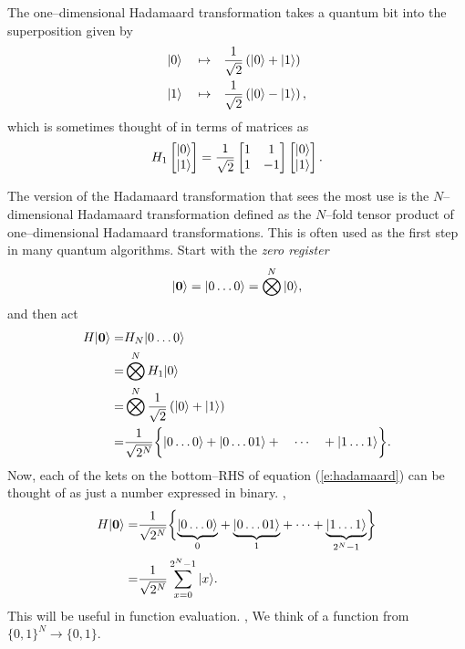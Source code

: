 The one--dimensional Hadamaard transformation takes a quantum bit into the
superposition given by
\begin{equation}
\begin{split}
{|{0}\rangle}\quad\mapsto&\quad\frac{1}{\sqrt{2}}\left({|{0}\rangle} +{|{1}\rangle}\right)\\
{|{1}\rangle}\quad\mapsto&\quad\frac{1}{\sqrt{2}}\left({|{0}\rangle} -{|{1}\rangle}\right),
\end{split}
\end{equation}
which is sometimes thought of in terms of matrices as
\begin{equation}
H_1 \left[\begin{matrix}{|{0}\rangle}\\ {|{1}\rangle}\end{matrix}\right]
= \frac{1}{\sqrt{2}}
\left[\begin{matrix}1&1\\ 1&-1\end{matrix}\right]
\left[\begin{matrix}{|{0}\rangle}\\ {|{1}\rangle}\end{matrix}\right].
\end{equation}

The version of the Hadamaard transformation that sees the most use is
the $N$--dimensional Hadamaard transformation defined as the $N$--fold
tensor product of one--dimensional Hadamaard transformations.
This is often used as the first step in many quantum algorithms.
Start with the \emph{zero register}
\begin{equation}
{|{\bf 0}\rangle}={|{0\ldots 0}\rangle} = \bigotimes^N{|{0}\rangle},
\end{equation}
and then act
\begin{equation}
\begin{split}
H{|{\bf 0}\rangle} =& H_N{|{0\ldots 0}\rangle}\\
=& \bigotimes^N H_1{|{0}\rangle}\\
=& \bigotimes^N \frac{1}{\sqrt{2}}\left({|{0}\rangle} +{|{1}\rangle}\right)\\
=& \frac{1}{\sqrt{2^N}}\biggl\lbrace {|{0\ldots 0}\rangle} + {|{0\ldots 01}\rangle} +
\quad\cdots\quad + {|{1\ldots 1}\rangle}\biggr\rbrace.
\end{split}
\label{e:hadamaard}
\end{equation}
Now, each of the kets on the bottom--RHS of equation (\ref{e:hadamaard})
can be thought of as just a number expressed in binary. \ie,
\begin{equation}
\begin{split}
H{|{\bf 0}\rangle} =& \frac{1}{\sqrt{2^N}}\biggl\lbrace 
\underset{0}{\underbrace{{|{0\ldots 0}\rangle}}}
+ \underset{1}{\underbrace{{|{0\ldots 01}\rangle}}} + \cdots 
+ \underset{2^N-1}{\underbrace{{|{1\ldots 1}\rangle}}}\biggr\rbrace \\
=& \frac{1}{\sqrt{2^N}}\sum_{x=0}^{2^N-1} {|{x}\rangle}.
\end{split}
\end{equation}
This will be useful in function evaluation. \ie, We think of a function
from $\lbrace 0,1\rbrace^N\to\lbrace 0,1\rbrace$.







